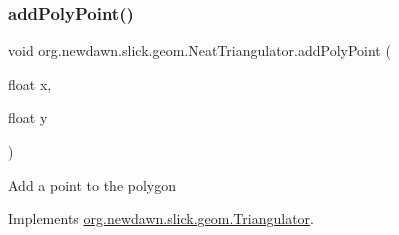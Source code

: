 \subsubsection{\texorpdfstring{add\+Poly\+Point()}{addPolyPoint()}}
{\footnotesize\ttfamily void org.\+newdawn.\+slick.\+geom.\+Neat\+Triangulator.\+add\+Poly\+Point (\begin{DoxyParamCaption}\item[{float}]{x,  }\item[{float}]{y }\end{DoxyParamCaption})\hspace{0.3cm}{\ttfamily [inline]}}

Add a point to the polygon 

Implements \mbox{\hyperlink{interfaceorg_1_1newdawn_1_1slick_1_1geom_1_1_triangulator_a32b11eccb582c7f4993a944df0b1db65}{org.\+newdawn.\+slick.\+geom.\+Triangulator}}.



